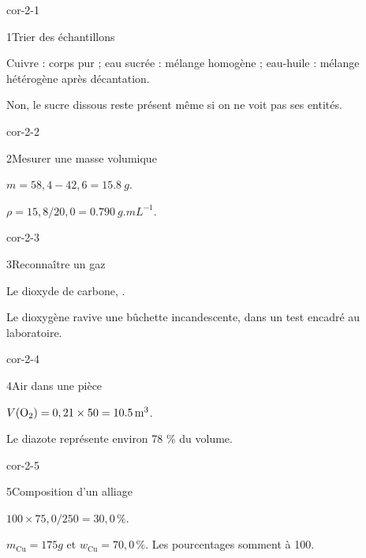 \clearpage{}
\corrigesSouples
\begin{blocLivre}{cor-2-1}\begin{corrige}{1}{Trier des échantillons}
\begin{questions}
\item Cuivre : corps pur ; eau sucrée : mélange homogène ; eau-huile : mélange hétérogène après décantation.
\item Non, le sucre dissous reste présent même si on ne voit pas ses entités.
\end{questions}
\end{corrige}\end{blocLivre}
\begin{blocLivre}{cor-2-2}\begin{corrige}{2}{Mesurer une masse volumique}
\begin{questions}
\item $m=58,4-42,6=\qty{15,8}{g}$.
\item $\rho=15,8/20,0=\qty{0,790}{g.mL^{-1}}$.
\end{questions}
\end{corrige}\end{blocLivre}
\begin{blocLivre}{cor-2-3}\begin{corrige}{3}{Reconnaître un gaz}
\begin{questions}
\item Le dioxyde de carbone, .
\item Le dioxygène ravive une bûchette incandescente, dans un test encadré au laboratoire.
\end{questions}
\end{corrige}\end{blocLivre}
\begin{blocLivre}{cor-2-4}\begin{corrige}{4}{Air dans une pièce}
\begin{questions}
\item $V(\ce{O2})=0,21\times50=\qty{10,5}{m^3}$.
\item Le diazote représente environ 78 \% du volume.
\end{questions}
\end{corrige}\end{blocLivre}
\begin{blocLivre}{cor-2-5}\begin{corrige}{5}{Composition d’un alliage}
\begin{questions}
\item $100\times75,0/250=30,0\,\%$.
\item $m_{\mathrm{Cu}}=175\unit{g}$ et $w_{\mathrm{Cu}}=70,0\,\%$. Les pourcentages somment à 100.
\end{questions}
\end{corrige}\end{blocLivre}
